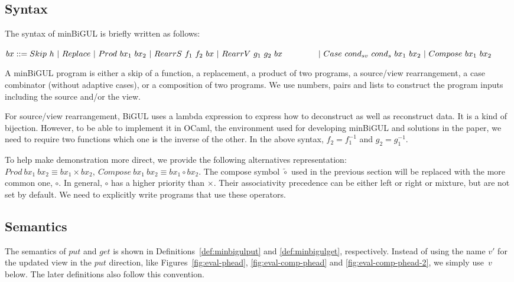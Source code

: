 \subsection{Syntax}

The syntax of minBiGUL is briefly written as follows:

\smallvspace
    $bx ::= Skip \ h \
        | \ Replace \
        | \ Prod \ bx_1 \ bx_2 \
        | \ RearrS \ f_1 \ f_2 \ bx \
        | \ RearrV \ g_1 \ g_2 \ bx \\
    \qtabs{2} | \ Case \ cond_{sv} \ cond_{s} \ bx_1 \ bx_2 \
        | \ Compose \ bx_1 \ bx_2$
\smallvspace
        
A minBiGUL program is either a skip of a function, a replacement, a product of two 
programs, a source/view rearrangement, a case combinator (without adaptive cases), or a composition of 
two programs. We use numbers, pairs and lists to construct the program inputs including the source and/or the view.

For source/view rearrangement, BiGUL uses 
a lambda expression to express how to deconstruct as well as reconstruct data. It is a kind of bijection. However, to be able to implement it in OCaml, the environment used for developing minBiGUL and solutions in the paper, we need to require two functions which one is the inverse of the other. In the above syntax, $f_2 = f_1^{-1}$ and $g_2 = g_1^{-1}$.

To help make demonstration more direct, we provide the following alternatives representation: $Prod \ bx_1 \ bx_2 \equiv bx_1 \times bx_2, \ Compose \ bx_1 \ bx_2 \equiv bx_1 \circ bx_2$. The compose symbol $\tilde{\circ}$ used in the previous section will be replaced with the more common one, $\circ$.
In general, $\circ$ has a higher priority than $\times$. Their associativity precedence can be either left or right or mixture, but are not set by default. We need to explicitly write programs that use these operators.

\subsection{Semantics}

The semantics of $put$ and $get$ is shown in Definitions~\ref{def:minbigulput} and \ref{def:minbigulget}, respectively. Instead of using the name $v'$ for the updated view in the $put$ direction, like Figures~\ref{fig:eval-phead}, \ref{fig:eval-comp-phead} and \ref{fig:eval-comp-phead-2}, we 
simply 
use~$v$ below. The later definitions also follow this convention.

